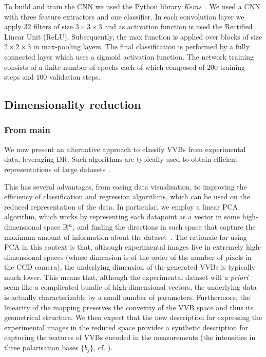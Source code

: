 To build and train the \ac{CNN} we used the Python library \emph{Keras}~\cite{chollet2015keras}.
We used a CNN with three feature extractors and one classifier. In each convolution layer we apply $32$ filters of size $3 \times 3 \times 3$ and as activation function is used the Rectified Linear Unit (ReLU). Subsequently, the max function is applied over blocks of size $2 \times 2 \times 3$  in max-pooling layers. %
The final classification is performed by a fully connected layer which uses a sigmoid activation function. The network training consists of a finite number of epochs each of which composed of $200$ training steps and $100$ validation steps. 


\subsection{Dimensionality reduction}
\label{sec:VVBs:dimensionality_reduction}

\subsubsection{From main}

We now present an alternative approach to classify \acp{VVB} from experimental data, leveraging \ac{DR}.
Such algorithms are typically used to obtain efficient representations of large datasets~\cite{cunningham2008dimension,fodor2002survey}.

This has several advantages, from easing data visualisation, to improving the efficiency of classification and regression algorithms, which can be used on the reduced representation of the data.
In particular, we employ a linear 
\ac{PCA} algorithm, which works by representing each datapoint as a vector in some high-dimensional space $\mathbb{R}^n$, and finding the directions in such space that capture the maximum amount of information about the dataset~\cite{jolliffe2011principal,jolliffe2016principal}.
The rationale for using \ac{PCA} in this context is that, although experimental images live in extremely high-dimensional spaces (whose dimension is of the order of the number of pixels in the \ac{CCD} camera), the underlying dimension of the generated \acp{VVB} is typically much lower.
This means that, although the experimental dataset will \emph{a priori} seem like a complicated bundle of high-dimensional vectors, the underlying data is actually characterizable by a small number of parameters. Furthermore, the linearity of the mapping preserves the convexity of the VVB space and thus its geometrical structure. We then expect that the new description for expressing the experimental images in the reduced space provides a synthetic description for capturing the features of VVBs encoded in the measurements (the intensities in three polarisation bases $\{b_j\}$, cf. \mbox{\cite{SI}}).

